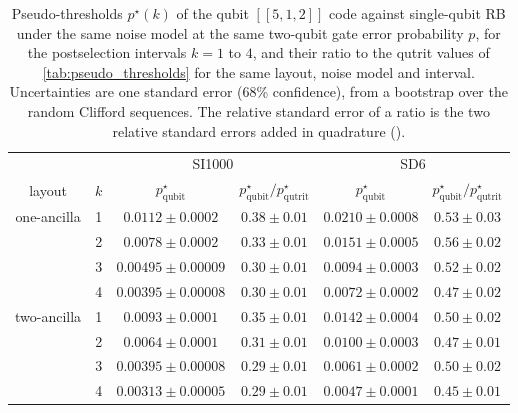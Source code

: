 \begin{table}[tp]
  \centering
  \begin{tabular}{cc|cc|cc}
    \hline
    & & \multicolumn{2}{c|}{SI1000} & \multicolumn{2}{c}{SD6} \\
    layout & $k$ & $p^\star_{\mathrm{qubit}}$ & $p^\star_{\mathrm{qubit}}/p^\star_{\mathrm{qutrit}}$ & $p^\star_{\mathrm{qubit}}$ & $p^\star_{\mathrm{qubit}}/p^\star_{\mathrm{qutrit}}$ \\
    \hline
    one-ancilla & 1 & $0.0112 \pm 0.0002$ & $0.38 \pm 0.01$ & $0.0210 \pm 0.0008$ & $0.53 \pm 0.03$ \\
     & 2 & $0.0078 \pm 0.0002$ & $0.33 \pm 0.01$ & $0.0151 \pm 0.0005$ & $0.56 \pm 0.02$ \\
     & 3 & $0.00495 \pm 0.00009$ & $0.30 \pm 0.01$ & $0.0094 \pm 0.0003$ & $0.52 \pm 0.02$ \\
     & 4 & $0.00395 \pm 0.00008$ & $0.30 \pm 0.01$ & $0.0072 \pm 0.0002$ & $0.47 \pm 0.02$ \\
    \hline
    two-ancilla & 1 & $0.0093 \pm 0.0001$ & $0.35 \pm 0.01$ & $0.0142 \pm 0.0004$ & $0.50 \pm 0.02$ \\
     & 2 & $0.0064 \pm 0.0001$ & $0.31 \pm 0.01$ & $0.0100 \pm 0.0003$ & $0.47 \pm 0.01$ \\
     & 3 & $0.00395 \pm 0.00008$ & $0.29 \pm 0.01$ & $0.0061 \pm 0.0002$ & $0.50 \pm 0.02$ \\
     & 4 & $0.00313 \pm 0.00005$ & $0.29 \pm 0.01$ & $0.0047 \pm 0.0001$ & $0.45 \pm 0.01$ \\
    \hline
  \end{tabular}
  \caption{Pseudo-thresholds $p^\star(k)$ of the qubit $[[5,1,2]]$ code against single-qubit RB under the same noise model at the same two-qubit gate error probability $p$, for the postselection intervals $k = 1$ to $4$, and their ratio to the qutrit values of \autoref{tab:pseudo_thresholds} for the same layout, noise model and interval. Uncertainties are one standard error (68\% confidence), from a bootstrap over the random Clifford sequences. The relative standard error of a ratio is the two relative standard errors added in quadrature ().}
  \label{tab:pseudo_thresholds_qubit}
\end{table}

